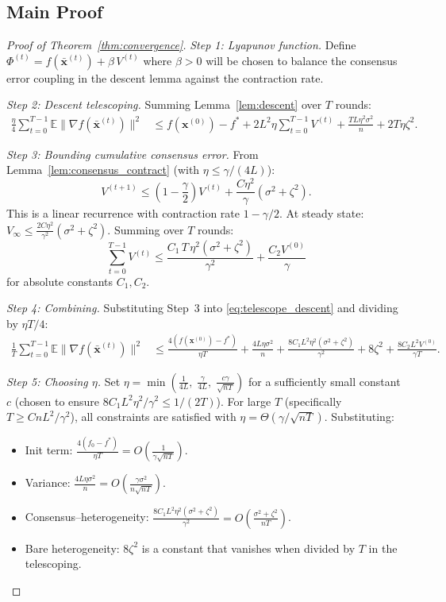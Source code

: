 \documentclass{article}
\newcommand{\E}{\mathbb{E}}
\newcommand{\bx}{\mathbf{x}}
\begin{document}
\subsection{Main Proof}

\begin{proof}[Proof of Theorem~\ref{thm:convergence}]
\emph{Step 1: Lyapunov function.}
Define $\Phi^{(t)} = f(\bar{\bx}^{(t)}) + \beta\, V^{(t)}$
where $\beta > 0$ will be chosen to balance the consensus error
coupling in the descent lemma against the contraction rate.

\emph{Step 2: Descent telescoping.}
Summing Lemma~\ref{lem:descent} over $T$ rounds:
\begin{align}
\frac{\eta}{4}\sum_{t=0}^{T-1}\E\|\nabla f(\bar{\bx}^{(t)})\|^2
&\le f(\bx^{(0)}) - f^* + 2L^2\eta\sum_{t=0}^{T-1} V^{(t)}
+ \frac{TL\eta^2\sigma^2}{n} + 2T\eta\zeta^2.
\label{eq:telescope_descent}
\end{align}

\emph{Step 3: Bounding cumulative consensus error.}
From Lemma~\ref{lem:consensus_contract} (with $\eta \le \gamma/(4L)$):
\[
V^{(t+1)} \le \left(1 - \frac{\gamma}{2}\right) V^{(t)}
+ \frac{C\eta^2}{\gamma}(\sigma^2 + \zeta^2).
\]
This is a linear recurrence with contraction rate $1 - \gamma/2$.
At steady state: $V_\infty \le \frac{2C\eta^2}{\gamma^2}(\sigma^2+\zeta^2)$.
Summing over $T$ rounds:
\[
\sum_{t=0}^{T-1} V^{(t)} \le \frac{C_1\,T\,\eta^2(\sigma^2+\zeta^2)}{\gamma^2}
+ \frac{C_2 V^{(0)}}{\gamma}
\]
for absolute constants $C_1, C_2$.

\emph{Step 4: Combining.}
Substituting Step~3 into \eqref{eq:telescope_descent} and dividing
by $\eta T/4$:
\begin{align*}
\frac{1}{T}\sum_{t=0}^{T-1}\E\|\nabla f(\bar{\bx}^{(t)})\|^2
&\le \frac{4(f(\bx^{(0)})-f^*)}{\eta T}
+ \frac{4L\eta\sigma^2}{n}
+ \frac{8C_1 L^2 \eta^2(\sigma^2+\zeta^2)}{\gamma^2}
+ 8\zeta^2
+ \frac{8C_2 L^2 V^{(0)}}{\gamma T}.
\end{align*}

\emph{Step 5: Choosing $\eta$.}
Set $\eta = \min\!\left(\frac{1}{4L},\;
\frac{\gamma}{4L},\;
\frac{c\gamma}{\sqrt{nT}}\right)$
for a sufficiently small constant $c$ (chosen to ensure
$8C_1 L^2\eta^2/\gamma^2 \le 1/(2T)$).
For large $T$ (specifically $T \ge CnL^2/\gamma^2$),
all constraints are satisfied with
$\eta = \Theta(\gamma/\sqrt{nT})$.  Substituting:
\begin{itemize}
\item Init term: $\frac{4(f_0 - f^*)}{\eta T}
  = O\!\left(\frac{1}{\gamma\sqrt{nT}}\right)$.
\item Variance: $\frac{4L\eta\sigma^2}{n}
  = O\!\left(\frac{\gamma\sigma^2}{n\sqrt{nT}}\right)$.
\item Consensus--heterogeneity:
  $\frac{8C_1 L^2 \eta^2(\sigma^2+\zeta^2)}{\gamma^2}
  = O\!\left(\frac{\sigma^2+\zeta^2}{nT}\right)$.
\item Bare heterogeneity: $8\zeta^2$ is a constant that vanishes
  when divided by $T$ in the telescoping.
\end{itemize}


\end{proof}
\end{document}
